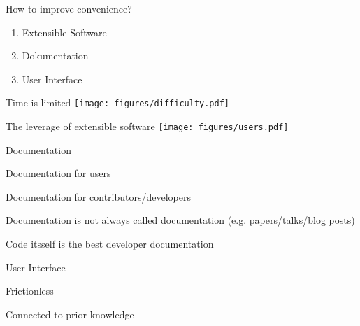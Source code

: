 \documentclass{beamer}
\newenvironment{wideitemize}{
    \itemize\addtolength{\itemsep}{15pt}\addtolength{\topsep}{10pt}}{\enditemize}
\begin{document}
    \begin{frame}{How to improve convenience?}
      \begin{enumerate}
        \item Extensible Software
        \item Dokumentation
        \item User Interface
      \end{enumerate}
    \end{frame}
    
    \begin{frame}[c]{Time is limited}
      \centering
      \texttt{[image: figures/difficulty.pdf]}
    \end{frame}
    
    \begin{frame}[c]{The leverage of extensible software}
      \centering
      \texttt{[image: figures/users.pdf]}
    \end{frame}

    \begin{frame}{Documentation}
      \begin{wideitemize}
        \item Documentation for users
        \item Documentation for contributors/developers
        \item<2-> Documentation is not always called documentation (e.g. papers/talks/blog posts)
                \item<3> Code itsself is the best developer documentation
      \end{wideitemize}
    \end{frame}

    \begin{frame}{User Interface}
      \begin{wideitemize}
        \item Frictionless
        \item Connected to prior knowledge
      \end{wideitemize}
    \end{frame}
    
    \begin{frame}[c]
    \end{frame}
\end{document}
